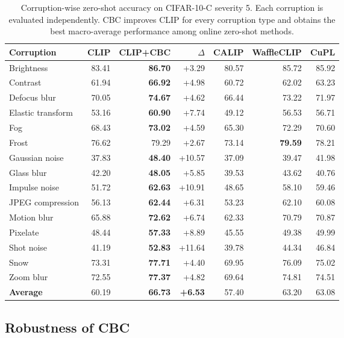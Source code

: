\begin{table}[t]
\centering
\caption{Corruption-wise zero-shot accuracy on CIFAR-10-C severity 5. Each corruption is evaluated independently. CBC improves CLIP for every corruption type and obtains the best macro-average performance among online zero-shot methods.}
\label{tab:corruption_wise}
\scriptsize
\setlength{\tabcolsep}{3.2pt}
\begin{tabular}{lrrrrrr}
\toprule
\textbf{Corruption} & \textbf{CLIP} & \textbf{CLIP+CBC} & \textbf{$\Delta$} & \textbf{CALIP} & \textbf{WaffleCLIP} & \textbf{CuPL} \\
\midrule
Brightness & 83.41 & \textbf{86.70} & +3.29 & 80.57 & 85.72 & 85.92 \\
Contrast & 61.94 & \textbf{66.92} & +4.98 & 60.72 & 62.02 & 63.23 \\
Defocus blur & 70.05 & \textbf{74.67} & +4.62 & 66.44 & 73.22 & 71.97 \\
Elastic transform & 53.16 & \textbf{60.90} & +7.74 & 49.12 & 56.53 & 56.71 \\
Fog & 68.43 & \textbf{73.02} & +4.59 & 65.30 & 72.29 & 70.60 \\
Frost & 76.62 & 79.29 & +2.67 & 73.14 & \textbf{79.59} & 78.21 \\
Gaussian noise & 37.83 & \textbf{48.40} & +10.57 & 37.09 & 39.47 & 41.98 \\
Glass blur & 42.20 & \textbf{48.05} & +5.85 & 39.53 & 43.62 & 40.76 \\
Impulse noise & 51.72 & \textbf{62.63} & +10.91 & 48.65 & 58.10 & 59.46 \\
JPEG compression & 56.13 & \textbf{62.44} & +6.31 & 53.23 & 62.10 & 60.08 \\
Motion blur & 65.88 & \textbf{72.62} & +6.74 & 62.33 & 70.79 & 70.87 \\
Pixelate & 48.44 & \textbf{57.33} & +8.89 & 45.55 & 49.38 & 49.99 \\
Shot noise & 41.19 & \textbf{52.83} & +11.64 & 39.78 & 44.34 & 46.84 \\
Snow & 73.31 & \textbf{77.71} & +4.40 & 69.95 & 76.09 & 75.02 \\
Zoom blur & 72.55 & \textbf{77.37} & +4.82 & 69.64 & 74.81 & 74.51 \\
\midrule
\textbf{Average} & 60.19 & \textbf{66.73} & \textbf{+6.53} & 57.40 & 63.20 & 63.08 \\
\bottomrule
\end{tabular}
\end{table}

\subsection{Robustness of CBC}
\label{subsec:robustness}

